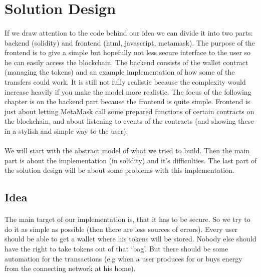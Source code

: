 \documentclass{scrartcl}
\begin{document}
    \section{Solution Design}
   
   \paragraph{}
   If we draw attention to the code behind our idea we can divide it into two parts: backend (solidity) and frontend (html, javascript, metamask). The purpose of the frontend is to give a simple but hopefully not less secure interface to the user so he can easily access the blockchain. The backend consists of the wallet contract (managing the tokens) and an example implementation of how some of the transfers could work. It is still not fully realistic because the complexity would increase heavily if you make the model more realistic. The focus of the following chapter is on the backend part because the frontend is quite simple. Frontend is just about letting MetaMask call some prepared functions of certain contracts on the blockchain, and about listening to events of the contracts (and showing these in a stylish and simple way to the user).
   
   \paragraph{}
   We will start with the abstract model of what we tried to build. Then the main part is about the implementation (in solidity) and it’s difficulties. The last part of the solution design will be about some problems with this implementation.
   
   \subsection{Idea}
   
   \paragraph{}
   The main target of our implementation is, that it has to be secure. So we try to do it as simple as possible (then there are less sources of errors). Every user should be able to get a wallet where his tokens will be stored. Nobody else should have the right to take tokens out of that ‘bag’. But there should be some automation for the transactions (e.g when a user produces for or buys energy from the connecting network at his home).
	
\end{document}
